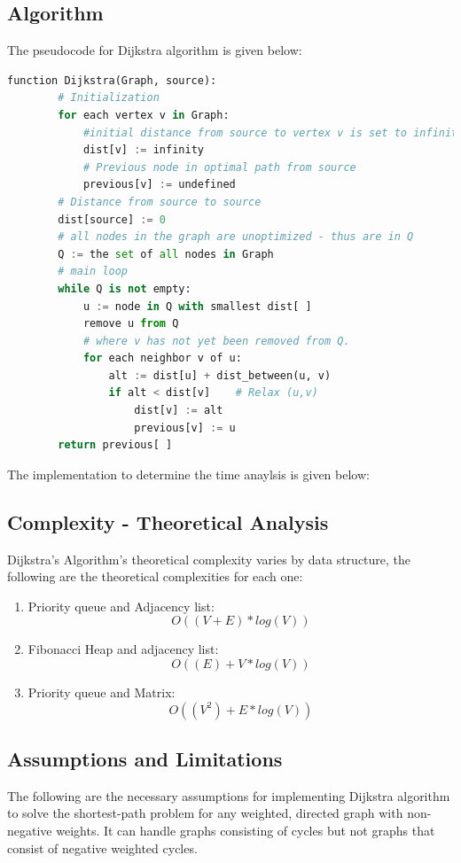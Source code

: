 \documentclass[a4paper, 12pt]{report}
\begin{document}
	\subsection{Algorithm}
	The pseudocode for Dijkstra algorithm is given below: \cite{Dijkstra} 
	
	\begin{lstlisting}[language=Python]
    function Dijkstra(Graph, source):
        # Initialization
        for each vertex v in Graph:    
            #initial distance from source to vertex v is set to infinite
            dist[v] := infinity 
            # Previous node in optimal path from source
            previous[v] := undefined  
        # Distance from source to source
        dist[source] := 0    
        # all nodes in the graph are unoptimized - thus are in Q
        Q := the set of all nodes in Graph 
        # main loop
        while Q is not empty:    
            u := node in Q with smallest dist[ ]
            remove u from Q
            # where v has not yet been removed from Q.
            for each neighbor v of u:    
                alt := dist[u] + dist_between(u, v)
                if alt < dist[v]    # Relax (u,v)
                    dist[v] := alt
                    previous[v] := u
        return previous[ ]
    \end{lstlisting}
    The implementation to determine the time anaylsis is given below:
	
	\subsection{Complexity - Theoretical Analysis}
	Dijkstra's Algorithm's theoretical complexity varies by data structure, the following are the theoretical complexities for each one:
	\begin{enumerate}
	    \item Priority queue and Adjacency list: \[O((V+E)*log(V))\]
	    \item Fibonacci Heap and adjacency list: 
	    \[O((E)+ V*log(V))\]
	    \item Priority queue and Matrix: \[O((V^2)+ E*log(V))\]
	\end{enumerate}
	
	\subsection{Assumptions and Limitations}
	The following are the necessary assumptions for implementing Dijkstra algorithm to solve the shortest-path problem for any weighted, directed graph with non-negative weights. It can handle graphs consisting of cycles but not graphs that consist of negative weighted cycles.
    
\end{document}
